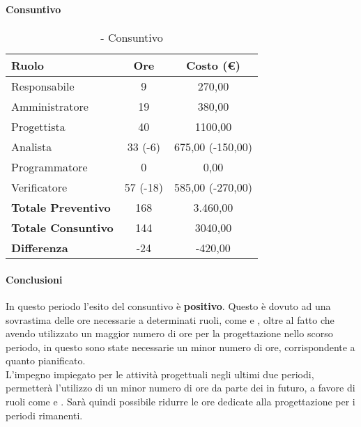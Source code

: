 \documentclass[./PianoDiProgetto.tex]{subfiles}
\begin{document}
\subsubsection{\PerPD}
\paragraph{Consuntivo}
		\begin{table}[h]
		\centering
		\begin{tabular}{l * {2}{c}}
			\toprule
			\textbf{Ruolo} & \textbf{Ore} & \textbf{Costo (\euro{})} \\
			\midrule
			Responsabile &	9 & 270,00 \\
			Amministratore & 19 & 380,00\\
			Progettista & 40  & 1100,00 \\
			Analista & 33 (-6) & 675,00 (-150,00) \\
			Programmatore & 0 & 0,00 \\
			Verificatore & 57 (-18) & 585,00 (-270,00) \\
			\midrule
			\textbf{Totale Preventivo} & 168
 & 3.460,00
 \\
			\textbf{Totale Consuntivo} & 144 & 3040,00
 \\
			\midrule
			\textbf{Differenza} & -24 & -420,00 \\
			\bottomrule
		\end{tabular}
		\caption{\PerPD{} - Consuntivo}

	\end{table}
	\paragraph{Conclusioni}
	In questo periodo l'esito del consuntivo è \textbf{positivo}. Questo è dovuto ad una sovrastima delle ore necessarie a determinati ruoli, come \AN{} e \VER{}, oltre al fatto che avendo utilizzato un maggior numero di ore per la progettazione nello scorso periodo, in questo sono 
state necessarie un minor numero di ore, corrispondente a quanto pianificato.\\
L'impegno impiegato per le attività progettuali negli ultimi due periodi, permetterà l'utilizzo di un minor numero di ore da parte dei \PJP{} in futuro, a favore di ruoli come \PRP{} e \VERP{}. Sarà quindi possibile ridurre le ore dedicate alla progettazione per i periodi rimanenti.
\subsubsection{\PerC}
\end{document}
